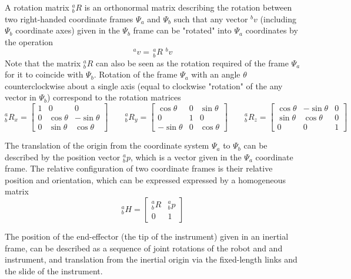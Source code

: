 A rotation matrix $^a_bR$ is an orthonormal matrix describing the rotation between two right-handed coordinate frames $\Psi_a$ and $\Psi_b$ such that any vector $^bv$ (including $\Psi_b$ coordinate axes) given in the $\Psi_b$ frame can be "rotated" into $\Psi_a$ coordinates by the operation
\begin{equation}
^av =\, ^a_bR \,\,^bv
\end{equation}
Note that the matrix $^a_bR$ can also be seen as the rotation required of the frame $\Psi_a$ for it to coincide with $\Psi_b$.
Rotation of the frame $\Psi_a$ with an angle $\theta$ counterclockwise about a single axis (equal to clockwise "rotation" of the any vector in $\Psi_b$) correspond to the rotation matrices
\begin{equation}
^a_bR_x = 
\begin{bmatrix}
1 & 0 & 0\\
0 & \cos\theta & -\sin\theta\\
0 & \sin\theta & \cos\theta
\end{bmatrix} 
\qquad
^a_bR_y = 
\begin{bmatrix}
\cos\theta & 0 & \sin\theta \\
0 & 1 & 0\\
-\sin\theta & 0 & \cos\theta
\end{bmatrix}
\qquad
^a_bR_z = 
\begin{bmatrix}
\cos\theta & -\sin\theta & 0\\
\sin\theta & \cos\theta & 0\\
0 & 0 & 1
\end{bmatrix}
\end{equation}

The translation of the origin from the coordinate system $\Psi_a$ to $\Psi_b$ can be described by the position vector $^a_bp$, which is a vector given in the $\Psi_a$ coordinate frame.
The relative configuration of two coordinate frames is their relative position and orientation, which can be expressed expressed by a homogeneous matrix
\begin{equation}
^a_bH = 
\begin{bmatrix}
^a_bR & ^a_bp\\
0 & 1
\end{bmatrix}
\end{equation}


The position of the end-effector (the tip of the instrument) given in an inertial frame, can be described as a sequence of joint rotations of the robot and and instrument, and translation from the inertial origin via the fixed-length links and the slide of the instrument.

